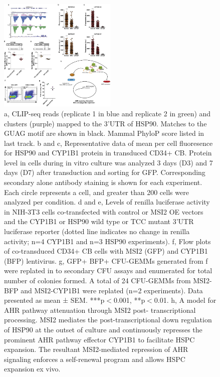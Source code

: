 \begin{figure}[ht]
  \centering
  \includegraphics[width=0.5\textwidth]{chapter_4_figures/Figure_S10}
  \caption[Supplementary Figure 4. MSI2 OE represses CYP1B1 and HSP90 3'UTR Renilla Luciferase reporter activity]{a, CLIP-seq reads (replicate 1 in blue and replicate 2 in green) and clusters (purple) mapped to the 3'UTR of HSP90. Matches to the GUAG motif are shown in black. Mammal PhyloP score listed in last track. b and c, Representative data of mean per cell fluoresence for HSP90 and CYP1B1 protein in transduced CD34+ CB. Protein level in cells during in vitro culture was analyzed 3 days (D3) and 7 days (D7) after transduction and sorting for GFP. Corresponding secondary alone antibody staining is shown for each experiment. Each circle represents a cell, and greater than 200 cells were analyzed per condition. d and e, Levels of renilla luciferase activity in NIH-3T3 cells co-transfected with control or MSI2 OE vectors and the CYP1B1 or HSP90 wild type or TCC mutant 3'UTR luciferase reporter (dotted line indicates no change in renilla activity; n=4 CYP1B1 and n=3 HSP90 experiments). f, Flow plots of co-transduced CD34+ CB cells with MSI2 (GFP) and CYP1B1 (BFP) lentivirus. g, GFP+ BFP+ CFU-GEMMs generated from f were replated in to secondary CFU assays and enumerated for total number of colonies formed. A total of 24 CFU-GEMMs from MSI2- BFP and MSI2-CYP1B1 were replated (n=2 experiments). Data presented as mean ± SEM. ***p$<$0.001, **p$<$0.01. h, A model for AHR pathway attenuation through MSI2 post- transcriptional processing. MSI2 mediates the post-transcriptional down regulation of HSP90 at the outset of culture and continuously represses the prominent AHR pathway effector CYP1B1 to facilitate HSPC expansion. The resultant MSI2-mediated repression of AHR signaling enforces a self-renewal program and allows HSPC expansion ex vivo. }
  \label{fig:Figure_S4}
\end{figure}

